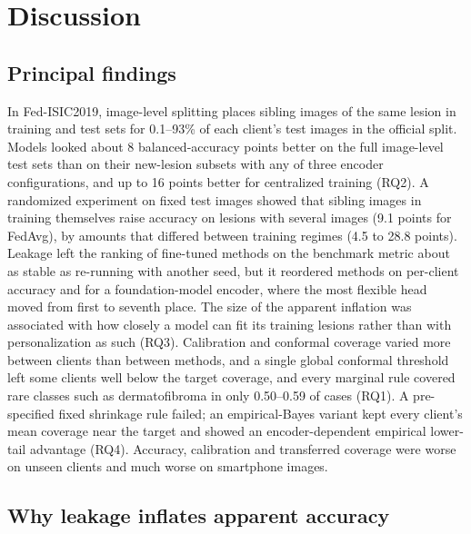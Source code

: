 \section{Discussion}
\label{sec:discussion}

\subsection{Principal findings}

In Fed-ISIC2019, image-level splitting places sibling images of the same lesion in training and test sets
for 0.1--93\% of each client's test images in the official split. Models looked about 8 balanced-accuracy
points better on the full image-level test sets than on their new-lesion subsets with any of three encoder
configurations, and up to 16 points better for centralized training (RQ2). A randomized experiment on fixed test images showed that sibling images in training themselves raise
accuracy on lesions with several images (9.1 points for FedAvg), by amounts that differed between training
regimes (4.5 to 28.8 points). Leakage left the
ranking of fine-tuned methods on the benchmark metric about as stable as re-running with another seed, but
it reordered methods on per-client accuracy and for a foundation-model encoder, where the most flexible
head moved from first to seventh place. The size of the apparent inflation was associated with how closely
a model can fit its training lesions rather than with personalization as such (RQ3). Calibration and
conformal coverage varied more between clients than between methods, and a single global conformal
threshold left some clients well below the target coverage, and every marginal rule covered rare classes such as dermatofibroma in only 0.50--0.59 of cases (RQ1). A pre-specified fixed shrinkage rule failed; an empirical-Bayes variant kept every client's mean coverage near the target and showed an encoder-dependent empirical lower-tail advantage (RQ4). Accuracy, calibration and transferred coverage were worse
on unseen clients and much worse on smartphone images.

\subsection{Why leakage inflates apparent accuracy}

